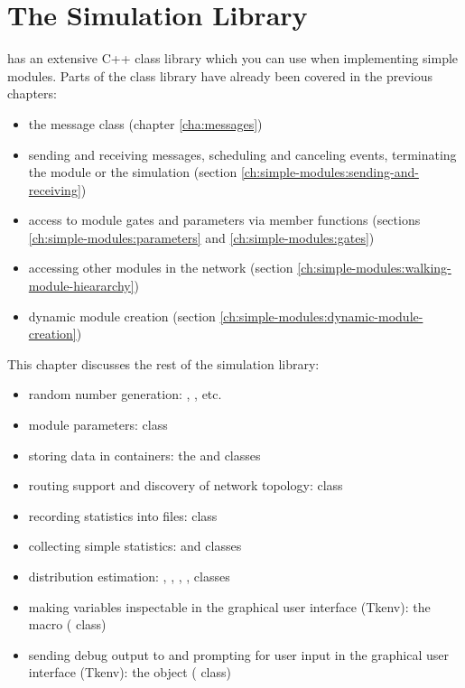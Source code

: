 \chapter{The Simulation Library}
\label{cha:the-simulation-library}

{\opp} has an extensive C++ class library which you can use when implementing
simple modules. Parts of the class library have already been covered in the
previous chapters:

\begin{itemize}
  \item{the message class  (chapter \ref{cha:messages})}
  \item{sending and receiving messages, scheduling and canceling
    events, terminating the module or the simulation
    (section \ref{ch:simple-modules:sending-and-receiving})}
  \item{access to module gates and parameters via  member functions
    (sections \ref{ch:simple-modules:parameters} and \ref{ch:simple-modules:gates})}
  \item{accessing other modules in the network (section \ref{ch:simple-modules:walking-module-hieararchy})}
  \item{dynamic module creation (section \ref{ch:simple-modules:dynamic-module-creation})}
\end{itemize}

This chapter discusses the rest of the simulation library:

\begin{itemize}
  \item{random number generation: ,
    , etc.}
  \item{module parameters:  class}
  \item{storing data in containers: the  and  classes}
  \item{routing support and discovery of network topology:  class}
  \item{recording statistics into files:  class}
  \item{collecting simple statistics:  and  classes}
  \item{distribution estimation: ,
    , , ,
     classes}
  \item{making variables inspectable in the graphical user interface
    (Tkenv): the  macro ( class)}
  \item{sending debug output to and prompting for user input in the graphical
    user interface (Tkenv): the  object ( class)}
\end{itemize}





